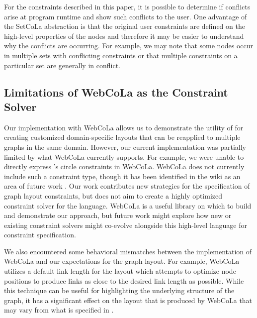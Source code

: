 For the constraints described in this paper, it is possible to determine if
conflicts arise at program runtime and show such conflicts to the user. One
advantage of the SetCoLa abstraction is that the original user constraints
are defined on the high-level properties of the nodes and therefore it may
be easier to understand why the conflicts are occurring. For example, we may
note that some nodes occur in multiple sets with conflicting constraints
or that multiple constraints on a particular set are generally in conflict.

\subsection{Limitations of WebCoLa as the Constraint Solver}



Our implementation with WebCoLa allows us to demonstrate the utility of
\projectname for creating customized domain-specific layouts that can be
reapplied to multiple graphs in the same domain. However, our current
implementation was partially limited by what WebCoLa currently supports. For
example, we were unable to directly express \projectname's circle constraints in
WebCoLa. WebCoLa does not currently include such a constraint type, though it
has been identified in the wiki as an area of future work
. Our work contributes new strategies for the
specification of graph layout constraints, but does not aim to create a
highly optimized constraint solver for the language. WebCoLa is a useful
library on which to build and demonstrate our approach, but 
future work might explore how new or existing constraint solvers might
co-evolve alongside this high-level language for constraint specification.

We also encountered some behavioral mismatches between the implementation
of WebCoLa and our expectations for the graph layout. For example, WebCoLa
utilizes a default link length for the layout which attempts to optimize
node positions to produce links as close to the desired link length as
possible. While this technique can be useful for highlighting the underlying 
structure of the graph, it has a significant effect on the layout that is
produced by WebCoLa that may vary from what is specified in \projectname.

